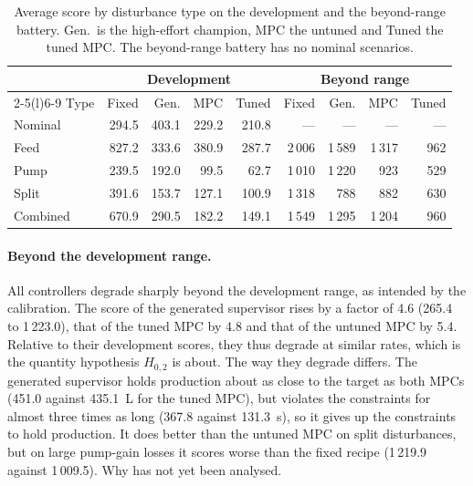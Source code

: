 \begin{table}[tb]
  \centering
  \caption{Average score by disturbance type on the development and the
    beyond-range battery. Gen.\ is the high-effort champion, MPC the
    untuned and Tuned the tuned MPC. The beyond-range battery has no nominal
    scenarios.}
  \label{tab:coord-kind}
  \small\setlength{\tabcolsep}{4pt}
  \begin{tabular}{@{}lrrrrrrrr@{}}
    \toprule
    & \multicolumn{4}{c}{Development} & \multicolumn{4}{c}{Beyond range} \\
    \cmidrule(lr){2-5}\cmidrule(l){6-9}
    Type & Fixed & Gen. & MPC & Tuned & Fixed & Gen. & MPC & Tuned \\
    \midrule
    Nominal  & 294.5 & 403.1 & 229.2 & 210.8 &      --- &      --- &      --- &   --- \\
    Feed     & 827.2 & 333.6 & 380.9 & 287.7 & 2\,006 & 1\,589 & 1\,317 & 962 \\
    Pump     & 239.5 & 192.0 &  99.5 &  62.7 & 1\,010 & 1\,220 &    923 & 529 \\
    Split    & 391.6 & 153.7 & 127.1 & 100.9 & 1\,318 &    788 &    882 & 630 \\
    Combined & 670.9 & 290.5 & 182.2 & 149.1 & 1\,549 & 1\,295 & 1\,204 & 960 \\
    \bottomrule
  \end{tabular}
\end{table}

\paragraph{Beyond the development range.} All controllers degrade sharply
beyond the development range, as intended by the calibration. The score of
the generated supervisor rises by a factor of 4.6 (265.4 to 1\,223.0), that
of the tuned MPC by 4.8 and that of the untuned MPC by 5.4. Relative to
their development scores, they thus degrade at similar rates, which is the
quantity hypothesis $H_{0,2}$ is about. The way they degrade differs. The
generated supervisor holds production about as close to the target as both
MPCs (451.0 against 435.1~L for the tuned MPC), but violates the constraints
for almost three times as long (367.8 against 131.3~s), so it gives up the
constraints to hold production. It does better than the untuned MPC on split
disturbances, but on large pump-gain losses it scores worse than the fixed
recipe (1\,219.9 against 1\,009.5). Why has not yet been analysed.


